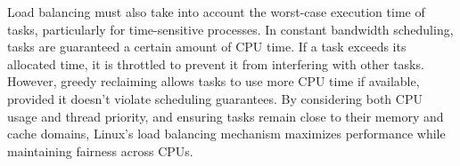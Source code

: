 Load balancing must also take into account the worst-case execution time of tasks, particularly for time-sensitive processes. 
In constant bandwidth scheduling, tasks are guaranteed a certain amount of CPU time. If a task exceeds its allocated time, it is throttled to prevent it from interfering with other tasks. 
However, greedy reclaiming allows tasks to use more CPU time if available, provided it doesn't violate scheduling guarantees.
By considering both CPU usage and thread priority, and ensuring tasks remain close to their memory and cache domains, Linux's load balancing mechanism maximizes performance while maintaining fairness across CPUs.